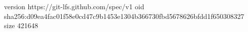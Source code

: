 version https://git-lfs.github.com/spec/v1
oid sha256:d09ea4fac01f58e0cd47c9b1453e1304b366730fbd5678626bfdd1f650308327
size 421648
